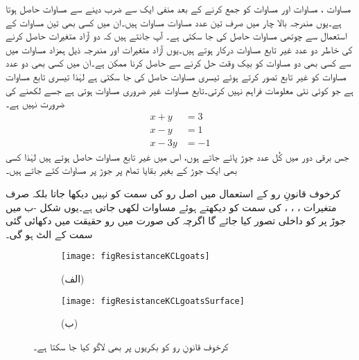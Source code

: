 مساوات ، مساوات  اور مساوات  کو جمع کرنے کے بعد منفی ایک  سے ضرب دینے سے مساوات  حاصل ہوتا ہے۔یوں مندرجہ بالا چار  میں صرف تین عدد مساوات  مساوات ہیں۔ان میں کسی بھی تین مساوات کے استعمال سے چوتھی مساوات حاصل کی جا سکتی ہے۔ آپ جانتے ہیں کہ دو آزاد متغیرات حاصل کرنے کی خاطر دو عدد غیر تابع مساوات درکار ہوتے ہیں۔یوں آزاد متغیرات  اور  مندرجہ ذیل ہمزاد مساوات  میں سے کسی بھی دو مساوات کو بیک وقت حل کرنے سے حاصل کرنا ممکن ہے۔ان میں کسی بھی دو عدد مساوات کو غیر تابع تصور کرتے ہوئے تیسری مساوات حاصل کی جا سکتی ہے لہٰذا تیسری تابع مساوات ہے جو کوئی نئی معلومات فراہم نہیں کرتی۔تابع مساوات غیر ضروری مساوات ہوتی ہے جسے لکھنے کی ضرورت نہیں ہے۔
\begin{align*}
x+y&=3\\
x-y&=1\\
x-3y&=-1
\end{align*}
جس برقی دور میں کُل  عدد جوڑ پائے جاتے ہوں، اس میں  غیر تابع مساوات حاصل ہوتے ہیں لہٰذا کسی بھی ایک جوڑ کے بغیر بقایا تمام پر جوڑ پر مساوات کئے جاتے ہیں۔


کرخوف قانونِ رو کے استعمال میں اصل رو کی سمت کو نہیں دیکھا جاتا بلکہ صرف متغیرات ، ، ،  کی سمت کو دیکھتے ہوئے مساوات لکھی جاتی ہے۔یوں شکل -ب میں جوڑ  پر  کو داخلی تصور کیا جائے گا اگرچہ  کی صورت میں رو حقیقت میں دکھائی گئی سمت کے الٹ ہو گی۔

\begin{figure}
\centering
\begin{subfigure}{0.4\textwidth}
\centering
\texttt{[image: figResistanceKCLgoats]}
\caption*{(الف)}
\end{subfigure}%
%
\begin{subfigure}{0.4\textwidth}
\centering
\texttt{[image: figResistanceKCLgoatsSurface]}
\caption*{(ب)}
\end{subfigure}%
\caption{کرخوف قانونِ رو کو بکریوں پر بھی لاگو کیا جا سکتا ہے۔}
\label{شکل_مزاحمتی_بکریاں_اور_کرخوف_قانون_رو}
\end{figure}

